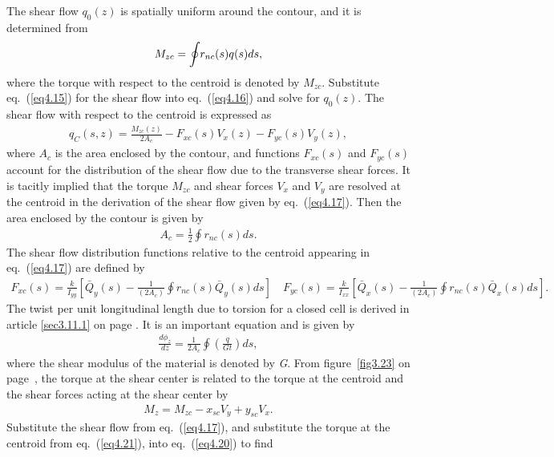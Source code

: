 \documentclass{AeroStructure-ERJohnson}
\begin{document}
\noindent The shear flow $q_{0}(z)$ is spatially uniform around the contour, and it is determined from
\begin{align}\label{eq4.16}
M_{z c}=\oint\kern-2pt r_{n c}(s) q(s) d s,
\end{align}
where the torque with respect to the centroid is denoted by $M_{z c}$. Substitute eq.~(\ref{eq4.15}) for the shear flow into eq.~(\ref{eq4.16}) and solve for $q_{0}(z)$. The shear flow with respect to the centroid is expressed as
\begin{align}\label{eq4.17}
q_{C}(s, z)=\frac{M_{z c}(z)}{2 A_{c}}-F_{x c}(s) V_{x}(z)-F_{y c}(s) V_{y}(z),
\end{align}
where $A_{c}$ is the area enclosed by the contour, and functions $F_{x c}(s)$ and $F_{y c}(s)$ account for the distribution of the shear flow due to the transverse shear forces. It is tacitly implied that the torque $M_{z c}$ and shear forces $V_{x}$ and $V_{y}$ are resolved at the centroid in the derivation of the shear flow given by eq.~(\ref{eq4.17}). Then the area enclosed by the contour is given by
\begin{align}\label{eq4.18}
A_{c}=\frac{1}{2} \oint\! r_{n c}(s) d s.
\end{align}
The shear flow distribution functions relative to the centroid appearing in eq.~(\ref{eq4.17}) are defined by
\begin{align}\label{eq4.19}
F_{x c}(s)=\frac{k}{I_{y y}}\left[\bar{Q}_{y}(s)-\frac{1}{\left(2 A_{c}\right)} \oint\! r_{n c}(s) \bar{Q}_{y}(s) d s\right] \quad F_{y c}(s)=\frac{k}{I_{x x}}\left[\bar{Q}_{x}(s)-\frac{1}{\left(2 A_{c}\right)} \oint\! r_{n c}(s) \bar{Q}_{x}(s) d s\right].
\end{align}
The twist per unit longitudinal length due to torsion for a closed cell is derived in article \ref{sec3.11.1} on page \pageref{sec3.11.1}. It is an important equation and is given by
\begin{align}\label{eq4.20}
\frac{d \phi_{z}}{d z}=\frac{1}{2 A_{c}} \oint\left(\frac{q}{G t}\right) d s,
\end{align}
where the shear modulus of the material is denoted by \textit{G}. From figure~\ref{fig3.23} on page~\pageref{fig3.23}, the torque at the shear center is related to the torque at the centroid and the shear forces acting at the shear center by
\begin{align}\label{eq4.21}
M_{z}=M_{z c}-x_{s c} V_{y}+y_{s c} V_{x}.
\end{align}
Substitute the shear flow from eq.~(\ref{eq4.17}), and substitute the torque at the centroid from eq.~(\ref{eq4.21}), into eq.~(\ref{eq4.20}) to find
\end{document}
